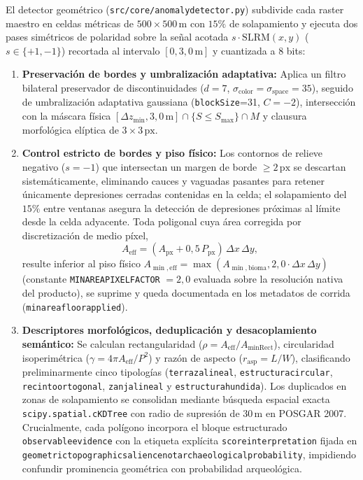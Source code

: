 \documentclass[11pt,a4paper]{article}
\DeclareRobustCommand{\_}{\ifmmode\mbox{\textunderscore}\else\textunderscore\allowbreak\fi}
\begin{document}
El detector geom\'etrico (\texttt{src/core/anomaly\_detector.py}) subdivide cada raster maestro en celdas m\'etricas de $500\times 500\,\mathrm{m}$ con $15\%$ de solapamiento y ejecuta dos pases sim\'etricos de polaridad sobre la se\~nal acotada $s\cdot \mathrm{SLRM}(x,y)$ ($s \in \{+1, -1\}$) recortada al intervalo $[0, 3{,}0\,\mathrm{m}]$ y cuantizada a 8 bits:
\begin{enumerate}
  \item \textbf{Preservaci\'on de bordes y umbralizaci\'on adaptativa:} Aplica un filtro bilateral preservador de discontinuidades ($d=7$, $\sigma_{\mathrm{color}} = \sigma_{\mathrm{space}} = 35$), seguido de umbralizaci\'on adaptativa gaussiana (\texttt{blockSize}=31, $C=-2$), intersecci\'on con la m\'ascara f\'isica $[\Delta z_{\min}, 3{,}0\,\mathrm{m}] \cap \{S \le S_{\max}\} \cap M$ y clausura morfol\'ogica el\'iptica de $3\times 3\,\mathrm{px}$.
  \item \textbf{Control estricto de bordes y piso f\'isico:} Los contornos de relieve negativo ($s=-1$) que intersectan un margen de borde $\ge 2\,\mathrm{px}$ se descartan sistem\'aticamente, eliminando cauces y vaguadas pasantes para retener \'unicamente depresiones cerradas contenidas en la celda; el solapamiento del $15\%$ entre ventanas asegura la detecci\'on de depresiones pr\'oximas al l\'imite desde la celda adyacente. Toda poligonal cuya \'area corregida por discretizaci\'on de medio p\'ixel,
  \begin{equation}
  A_{\mathrm{eff}} = \left(A_{\mathrm{px}} + 0{,}5\,P_{\mathrm{px}}\right)\,\Delta x\,\Delta y,
  \label{eq:area_corr}
  \end{equation}
  resulte inferior al piso f\'isico $A_{\min,\mathrm{eff}} = \max(A_{\min,\mathrm{bioma}}, 2{,}0 \cdot \Delta x\,\Delta y)$ (constante \texttt{MIN\_AREA\_PIXEL\_FACTOR} $= 2{,}0$ evaluada sobre la resoluci\'on nativa del producto), se suprime y queda documentada en los metadatos de corrida (\texttt{min\_area\_floor\_applied}).
  \item \textbf{Descriptores morfol\'ogicos, deduplicaci\'on y desacoplamiento sem\'antico:} Se calculan rectangularidad ($\rho = A_{\mathrm{eff}} / A_{\mathrm{minRect}}$), circularidad isoperim\'etrica ($\gamma = 4\pi A_{\mathrm{eff}} / P^2$) y raz\'on de aspecto ($r_{\mathrm{asp}} = L/W$), clasificando preliminarmente cinco tipolog\'ias (\texttt{terraza\_lineal}, \texttt{estructura\_circular}, \texttt{recinto\_ortogonal}, \texttt{zanja\_lineal} y \texttt{estructura\_hundida}). Los duplicados en zonas de solapamiento se consolidan mediante b\'usqueda espacial exacta \texttt{scipy.spatial.cKDTree} con radio de supresi\'on de $30\,\mathrm{m}$ en POSGAR 2007. Crucialmente, cada pol\'igono incorpora el bloque estructurado \texttt{observable\_evidence} con la etiqueta expl\'icita \texttt{score\_interpretation} fijada en \texttt{\textquotedbl{}geometric\_topographic\_salience\_not\_archaeological\_probability\textquotedbl{}}, impidiendo confundir prominencia geom\'etrica con probabilidad arqueol\'ogica.
\end{enumerate}
\end{document}
